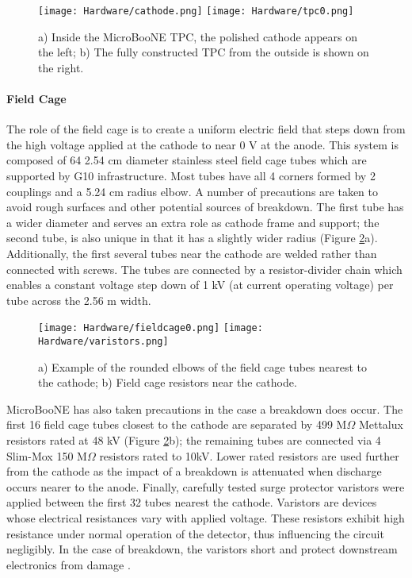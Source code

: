 \begin{figure}[h!]
\centering
\texttt{[image: Hardware/cathode.png]}
\hspace{3 mm}
\texttt{[image: Hardware/tpc0.png]}
\caption{a) Inside the MicroBooNE TPC, the polished cathode appears on the left; b) The fully constructed TPC from the outside is shown on the right. }
\label{fig:cathodeShine}
\end{figure}

\paragraph{Field Cage}
\par The role of the field cage is to create a uniform electric field that steps down from the high voltage applied at the cathode to near 0 V at the anode.  This system is composed of 64 2.54 cm diameter stainless steel field cage tubes which are supported by G10 infrastructure. Most tubes have all 4 corners formed by 2 couplings and a 5.24 cm radius elbow. A number of precautions are taken to avoid rough surfaces and other potential sources of breakdown. The first tube has a wider diameter and serves an extra role as cathode frame and support; the second tube, is also unique in that it has a slightly wider radius (Figure \ref{fig:fieldcage}a). Additionally, the first several tubes near the cathode are welded rather than connected with screws.  The tubes are connected by a resistor-divider chain which enables a constant voltage step down of 1 kV (at current operating voltage) per tube across the 2.56 m width. 

\begin{figure}[H]
\centering
\texttt{[image: Hardware/fieldcage0.png]}
\hspace{4mm}
\texttt{[image: Hardware/varistors.png]}
\caption{ a) Example of the rounded elbows of the field cage tubes nearest to the cathode; b) Field cage resistors near the cathode. }
\label{fig:fieldcage}
\end{figure}

\par MicroBooNE has also taken precautions in the case a breakdown does occur. The first 16 field cage tubes closest to the cathode are separated by 499 M$\Omega$ Mettalux resistors rated at 48 kV (Figure \ref{fig:fieldcage}b); the remaining tubes are connected via 4 Slim-Mox 150 M$\Omega$ resistors rated to 10kV. Lower rated resistors are used further from the cathode as the impact of a breakdown is attenuated when discharge occurs nearer to the anode. Finally, carefully tested surge protector varistors were applied between the first 32 tubes nearest the cathode.  Varistors are devices whose electrical resistances vary with applied voltage. These resistors exhibit high resistance under normal operation of the detector, thus influencing the circuit negligibly. In the case of breakdown, the varistors short and protect downstream electronics from damage \cite{bib:surge}.

